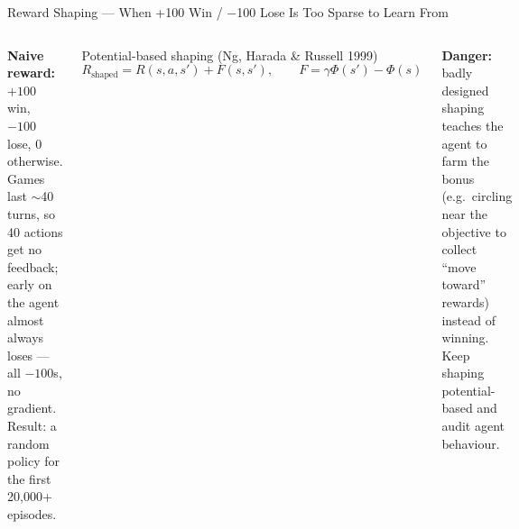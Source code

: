 \documentclass[aspectratio=169,10pt,t]{beamer}
\begin{document}
\begin{frame}{Reward Shaping --- When +100 Win / $-$100 Lose Is Too Sparse to Learn From}
\begin{columns}[T]
\begin{wbox}\scriptsize\textbf{Naive reward:} $+100$ win, $-100$ lose, 0 otherwise. Games last $\sim$40 turns, so 40 actions get no feedback; early on the agent almost always loses --- all $-100$s, no gradient. Result: a random policy for the first 20,000+ episodes.\end{wbox}
\begin{fbx}{Potential-based shaping (Ng, Harada \& Russell 1999)}\[R_{\text{shaped}}=R(s,a,s')+F(s,s'),\qquad F=\gamma\Phi(s')-\Phi(s)\]\end{fbx}
\begin{ibox}\scriptsize\textbf{Danger:} badly designed shaping teaches the agent to farm the bonus (e.g.\ circling near the objective to collect ``move toward'' rewards) instead of winning. Keep shaping potential-based and audit agent behaviour.\end{ibox}
\end{columns}
\end{frame}
\end{document}
